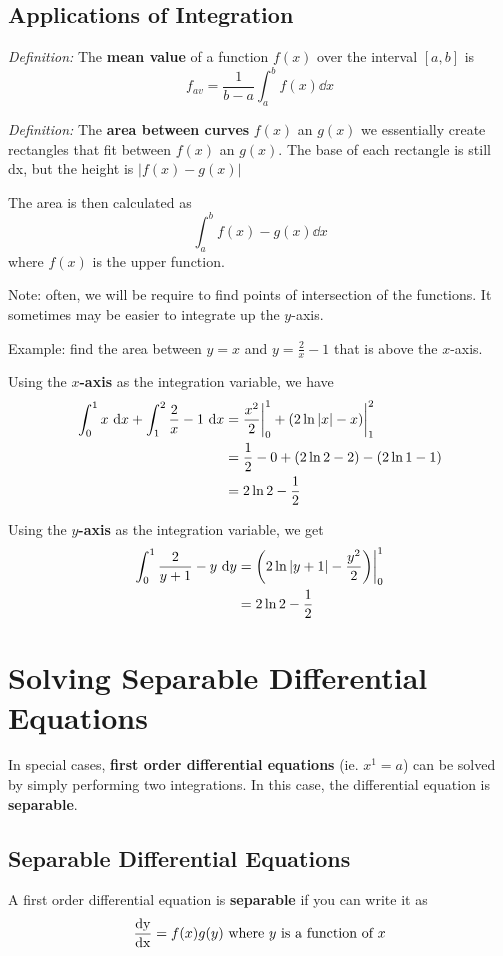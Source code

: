 \documentclass[12pt]{article}
\begin{document}
\subsection*{Applications of Integration}
\textit{Definition:} The {\bf mean value} of a function $f(x)$ over the interval $[a,b]$ is \[ f_{av} = \frac{1}{b-a}\int_a^b f(x) \dd x \]

\textit{Definition:} The {\bf area between curves} $f(x)$ an $g(x)$ we essentially create rectangles that fit between $f(x)$ an $g(x)$. The base of each rectangle is still dx, but the height is $|f(x) - g(x)|$

The area is then calculated as \[ \int_a^b f(x)-g(x) \dd x \] where $f(x)$ is the upper function.

Note: often, we will be require to find points of intersection of the functions. It sometimes may be easier to integrate up the $y$-axis.

Example: find the area between $y = x$ and $y = \frac{2}{x} - 1$ that is above the $x$-axis.

Using the {\bf $x$-axis} as the integration variable, we have
\begin{align*}
\int_0^1 x \ {\rm d} x + \int_1^2 \frac{2}{x} - 1 \ {\rm d} x &= \frac{x^2}{2}\bigg|_0^1 + (2\ln|x| - x)\bigg|_1^2\\
&= \frac{1}{2} - 0 + (2\ln 2 - 2) - (2\ln 1 - 1)\\
&= 2\ln 2 - \frac{1}{2}
\end{align*}

Using the {\bf $y$-axis} as the integration variable, we get
\begin{align*}
\int_0^1 \frac{2}{y+1} - y \ {\rm d} y &= \bigg(2\ln|y+1| - \frac{y^2}{2}\bigg)\bigg|_0^1\\
&= 2\ln 2 - \frac{1}{2}
\end{align*}

\section*{Solving Separable Differential Equations}
In special cases, {\bf first order differential equations} (ie. $x^1 = a$) can be solved by simply performing two integrations. In this case, the differential equation is {\bf separable}.

\subsection*{Separable Differential Equations}
A first order differential equation is {\bf separable} if you can write it as \[ \frac{{\rm dy}}{{\rm dx}} = f(x)g(y) \text{ where $y$ is a function of $x$} \]
\end{document}

